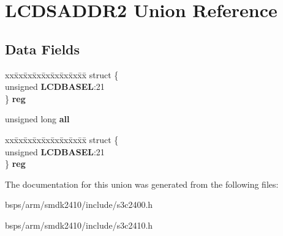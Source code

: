 \hypertarget{unionLCDSADDR2}{}\section{L\+C\+D\+S\+A\+D\+D\+R2 Union Reference}
\label{unionLCDSADDR2}
\subsection*{Data Fields}
\begin{DoxyCompactItemize}
\item 
\mbox{\label{unionLCDSADDR2_a3cecac3d394b4c83c18f259a4e8c6e56}} 
\begin{tabbing}
xx\=xx\=xx\=xx\=xx\=xx\=xx\=xx\=xx\=\kill
struct \{\\
\>unsigned {\bfseries LCDBASEL}:21\\
\} {\bfseries reg}\\

\end{tabbing}\item 
\mbox{\label{unionLCDSADDR2_a54a01a63a30660905d1247fcfd095b7d}} 
unsigned long {\bfseries all}
\item 
\mbox{\label{unionLCDSADDR2_ad278d054bea28b1e0075ad397fea24c5}} 
\begin{tabbing}
xx\=xx\=xx\=xx\=xx\=xx\=xx\=xx\=xx\=\kill
struct \{\\
\>unsigned {\bfseries LCDBASEL}:21\\
\} {\bfseries reg}\\

\end{tabbing}\end{DoxyCompactItemize}


The documentation for this union was generated from the following files\+:\begin{DoxyCompactItemize}
\item 
bsps/arm/smdk2410/include/s3c2400.\+h\item 
bsps/arm/smdk2410/include/s3c2410.\+h\end{DoxyCompactItemize}
